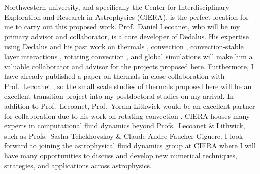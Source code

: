 \documentclass[preprint, hmargin=1in, vmargin=1in]{aastex62}
\begin{document}
Northwestern university, and specifically the Center for Interdisciplinary Exploration and Research in Astrophysics (CIERA), is the perfect location for me to carry out this proposed work.
Prof.~Daniel Lecoanet, who will be my primary advisor and collaborator, is a core developer of Dedalus.
His expertise using Dedalus and his past work on thermals \citep{lecoanet&jeevanjee2019, tarshish&all2018}, convection \citep{lecoanet&quataert2013, lecoanet&all2014}, convection-stable layer interactions \citep{lecoanet&all2016, couston&all2017}, rotating convection \citep{couston&all2019}, and global simulations \citep{lecoanet&all2019} will make him a valuable collaborator and advisor for the projects proposed here.
Furthermore, I have already published a paper on thermals in close collaboration with Prof.~Lecoanet \citep{andersLB2019}, so the small scale studies of thermals proposed here will be an excellent transition project into my postdoctoral studies on my arrival.
In addition to Prof.~Lecoanet, Prof.~Yoram Lithwick would be an excellent partner for collaboration due to his work on rotating convection \citep[e.g.,][]{BDLithwick2014}.
CIERA houses many experts in computational fluid dynamics beyond Profs.~Lecoanet \& Lithwick, such as Profs.~Sasha Tchekhovskoy \& Claude-Andre Faucher-Giguere.
I look forward to joining the astrophysical fluid dynamics group at CIERA where I will have many opportunities to discuss and develop new numerical techniques, strategies, and applications across astrophysics.




\end{document}
